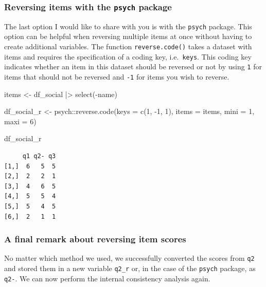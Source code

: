 \documentclass[
  letterpaper,
  DIV=11,
  numbers=noendperiod]{scrreprt}
\newenvironment{Shaded}{\begin{snugshade}}{\end{snugshade}}
\newcommand{\AttributeTok}[1]{\textcolor[rgb]{0.40,0.45,0.13}{#1}}
\newcommand{\DecValTok}[1]{\textcolor[rgb]{0.68,0.00,0.00}{#1}}
\newcommand{\FunctionTok}[1]{\textcolor[rgb]{0.28,0.35,0.67}{#1}}
\newcommand{\NormalTok}[1]{\textcolor[rgb]{0.00,0.23,0.31}{#1}}
\newcommand{\OtherTok}[1]{\textcolor[rgb]{0.00,0.23,0.31}{#1}}
\newcommand{\SpecialCharTok}[1]{\textcolor[rgb]{0.37,0.37,0.37}{#1}}
\begin{document}
\subsubsection{\texorpdfstring{Reversing items with the \texttt{psych}
package}{Reversing items with the psych package}}\label{sec-reversing-items-psych}

The last option I would like to share with you is with the
\texttt{psych} package. This option can be helpful when reversing
multiple items at once without having to create additional variables.
The function \texttt{reverse.code()} takes a dataset with items and
requires the specification of a coding key, i.e.~\texttt{keys}. This
coding key indicates whether an item in this dataset should be reversed
or not by using \texttt{1} for items that should not be reversed and
\texttt{-1} for items you wish to reverse.

\begin{Shaded}
\begin{Highlighting}[]
\NormalTok{items }\OtherTok{\textless{}{-}}\NormalTok{ df\_social }\SpecialCharTok{|\textgreater{}} \FunctionTok{select}\NormalTok{(}\SpecialCharTok{{-}}\NormalTok{name)}

\NormalTok{df\_social\_r }\OtherTok{\textless{}{-}}\NormalTok{ psych}\SpecialCharTok{::}\FunctionTok{reverse.code}\NormalTok{(}\AttributeTok{keys =} \FunctionTok{c}\NormalTok{(}\DecValTok{1}\NormalTok{, }\SpecialCharTok{{-}}\DecValTok{1}\NormalTok{, }\DecValTok{1}\NormalTok{),}
                      \AttributeTok{items =}\NormalTok{ items,}
                      \AttributeTok{mini =} \DecValTok{1}\NormalTok{,}
                      \AttributeTok{maxi =} \DecValTok{6}\NormalTok{)}

\NormalTok{df\_social\_r}
\end{Highlighting}
\end{Shaded}

\begin{verbatim}
     q1 q2- q3
[1,]  6   5  5
[2,]  2   2  1
[3,]  4   6  5
[4,]  5   5  4
[5,]  5   4  5
[6,]  2   1  1
\end{verbatim}

\subsubsection{A final remark about reversing item
scores}\label{sec-reversing-items-final-remark}

No matter which method we used, we successfully converted the scores
from \texttt{q2} and stored them in a new variable \texttt{q2\_r} or, in
the case of the \texttt{psych} package, as \texttt{q2-}. We can now
perform the internal consistency analysis again.
\end{document}
